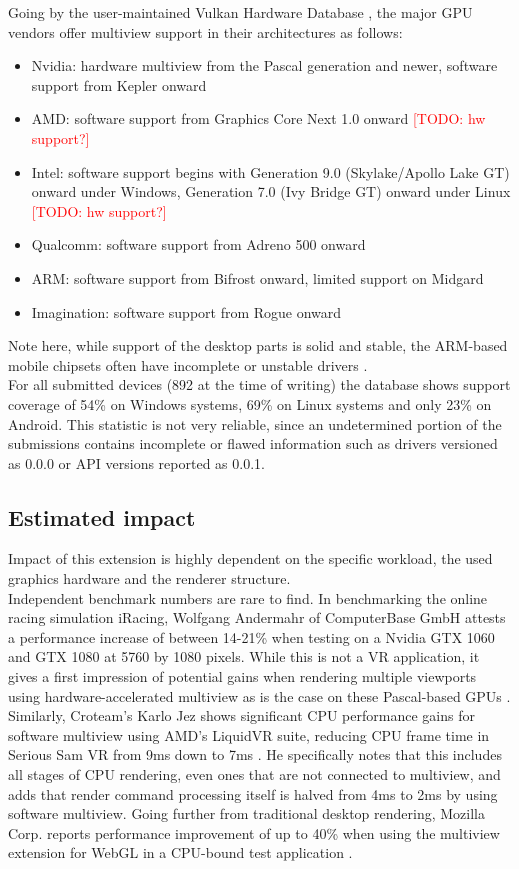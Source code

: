 Going by the user-maintained Vulkan Hardware Database \cite{Willems.2020}, the major GPU vendors offer multiview support in their architectures as follows: 
\begin{itemize}
\item Nvidia: hardware multiview from the Pascal generation and newer, software support from Kepler onward
\item AMD: software support from Graphics Core Next 1.0 onward \textcolor{red}{[TODO: hw support?]}
\item Intel: software support begins with Generation 9.0 (Skylake/Apollo Lake GT) onward under Windows, Generation 7.0 (Ivy Bridge GT) onward under Linux \textcolor{red}{[TODO: hw support?]}
\item Qualcomm: software support from Adreno 500 onward
\item ARM: software support from Bifrost onward, limited support on Midgard
\item Imagination: software support from Rogue onward
\end{itemize}
Note here, while support of the desktop parts is solid and stable, the ARM-based mobile chipsets often have incomplete or unstable drivers \cite{Willems.2019}\cite{JMC47.2018}. \\
For all submitted devices (892 at the time of writing) the database shows support coverage of 54\% on Windows systems, 69\% on Linux systems and only 23\% on Android. This statistic is not very reliable, since an undetermined portion of the submissions contains incomplete or flawed information such as drivers versioned as 0.0.0 or API versions reported as 0.0.1. 

\subsection{Estimated impact}
Impact of this extension is highly dependent on the specific workload, the used graphics hardware and the renderer structure. \\
Independent benchmark numbers are rare to find. In benchmarking the online racing simulation iRacing, Wolfgang Andermahr of ComputerBase GmbH attests a performance increase of between 14-21\% when testing on a Nvidia GTX 1060 and GTX 1080 at 5760 by 1080 pixels. While this is not a VR application, it gives a first impression of potential gains when rendering multiple viewports using hardware-accelerated multiview as is the case on these Pascal-based GPUs \cite{Andermahr.2016}.
Similarly, Croteam's Karlo Jez shows significant CPU performance gains for software multiview using AMD's LiquidVR suite, reducing CPU frame time in Serious Sam \gls{VR} from 9ms down to 7ms \cite{Jez.2017}. He specifically notes that this includes all stages of CPU rendering, even ones that are not connected to multiview, and adds that render command processing itself is halved from 4ms to 2ms by using software multiview. 
Going further from traditional desktop rendering, Mozilla Corp. reports performance improvement of up to 40\% when using the multiview extension for WebGL in a CPU-bound test application \cite{Serrano.2019}. 

